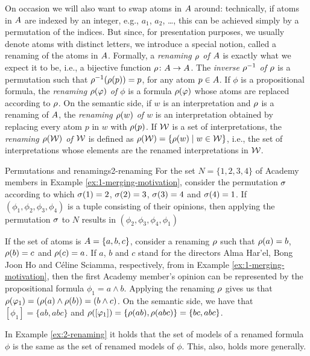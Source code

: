 On occasion we will also want to swap atoms in $A$ around:
technically, if atoms in $A$ are indexed by an integer, 
e.g., $a_1$, $a_2$, \dots, this can be achieved simply by a permutation of the indices.
But since, for presentation purposes, we usually denote atoms with distinct letters,
we introduce a special notion, called a renaming of the atoms in $A$.
Formally, a \emph{renaming $\rho$ of $A$} is exactly what we expect it to be,
i.e., a bijective function $\rho\colon A\rightarrow A$.
The \emph{inverse $\rho^{-1}$ of $\rho$} 
is a permutation such that $\rho^{-1}(\rho(p))=p$, for any atom $p\in A$.
If $\phi$ is a propositional formula, the \emph{renaming $\rho(\varphi)$ of $\phi$}
is a formula $\rho(\varphi)$ whose atoms are replaced according to $\rho$.
On the semantic side,
if $w$ is an interpretation and $\rho$ is a renaming of $A$,
the \emph{renaming $\rho(w)$ of $w$} is an interpretation obtained 
by replacing every atom $p$ in $w$ with $\rho(p)$.
If $\mathcal{W}$ is a set of interpretations, the \emph{renaming $\rho(\mathcal{W})$ of $\mathcal{W}$} is 
defined as $\rho(\mathcal{W})=\{\rho(w)\mid w\in\mathcal{W}\}$,
i.e., the set of interpretations whose elements are the renamed interpretations in $\mathcal{W}$.

\begin{xmpl}{Permutations and renamings}{2-renaming}
	For the set $N=\{1,2,3,4\}$ of Academy members 
	in Example \ref{ex:1-merging-motivation}, 
	consider the permutation $\sigma$ 
	according to which $\sigma(1)=2$, $\sigma(2)=3$, $\sigma(3)=4$ and $\sigma(4)=1$.
	If $(\phi_1,\phi_2,\phi_3,\phi_4)$ is a tuple consisting of their opinions,
	then applying the permutation $\sigma$ to $N$ results in 
	$(\phi_2,\phi_3,\phi_4,\phi_1)$

	If the set of atoms is $A=\{a,b,c\}$,
	consider a renaming $\rho$ such that
	$\rho(a)=b$,
	$\rho(b)=c$ and
	$\rho(c)=a$.
	If $a$, $b$ and $c$
	stand for the directors 
	Alma Har'el, Bong Joon Ho and C\'eline Sciamma, respectively,
	from in Example \ref{ex:1-merging-motivation},
	then the first Academy member's opinion 
	can be represented by the propositional formula
	$\phi_1 = a\land b$.
	Applying the renaming $\rho$ gives us that
	$\rho(\varphi_1)= (\rho(a)\land\rho(b)) = (b\land c)$.
	On the semantic side,
	we have that $[\phi_1] = \{ab,abc\}$ and 
	$\rho([\varphi_1]) = \{\rho(ab), \rho(abc)\} 
	= \{bc,abc\}$.
\end{xmpl}

In Example \ref{ex:2-renaming} it holds that the set of models 
of a renamed formula $\phi$ 
is the same as the set of renamed models of $\phi$. 
This, also, holds more generally.

